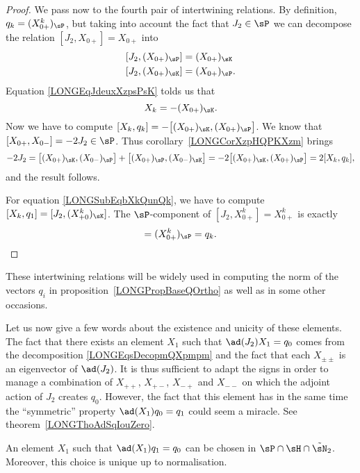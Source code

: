 \begin{proof}
	We pass now to the fourth pair of intertwining relations. By definition, $q_k=(X^k_{0+})_{\sP}$, but taking into account the fact that $J_2\in\sP$ we can decompose the relation $[J_2,X_{0+}]=X_{0+}$ into
	\begin{subequations}
		\begin{align}
			[J_2,(X_{0+})_{\sP}] & =(X_{0+})_{\sK}		\label{LONGEqJdeuxXzpsPsK} \\
			[J_2,(X_{0+})_{\sK}] & =(X_{0+})_{\sP}.
		\end{align}
	\end{subequations}
	Equation \eqref{LONGEqJdeuxXzpsPsK} tolds us that
	\begin{equation}
		X_k=-(X_{0+})_{\sK}.
	\end{equation}
	Now we have to compute $[X_k,q_k]=-\big[ (X_{0+})_{\sK},(X_{0+})_{\sP} \big]$. We know that $[X_{0+},X_{0-}]=-2J_2\in\sP$. Thus corollary~\ref{LONGCorXzpHQPKXzm} brings
	\begin{equation}
		-2J_2=\big[ (X_{0+})_{\sK},(X_{0-})_{\sP} \big]+\big[ (X_{0+})_{\sP},(X_{0-})_{\sK} \big]=-2\big[ (X_{0+})_{\sK},(X_{0+})_{\sP} \big]=2[X_k,q_k],
	\end{equation}
	and the result follows.

	For equation \eqref{LONGSubEqbXkQunQk}, we have to compute $[X_k,q_1]=[J_2,(X_{+0}^k)_{\sK}]$. The $\sP$-component of $[J_2,X_{0+}^k]=X_{0+}^k$ is exactly
	\begin{equation}
		[J_2,(X_{0+}^k)_{\sK}]=(X_{0+}^k)_{\sP}=q_k.
	\end{equation}

\end{proof}

These intertwining relations will be widely used in computing the norm of the vectors $q_i$ in proposition~\ref{LONGPropBaseQOrtho} as well as in some other occasions.

Let us now give a few words about the existence and unicity of these elements. The fact that there exists an element $X_1$ such that $\ad(J_2)X_1=q_0$ comes from the decomposition \eqref{LONGEqsDecopmQXpmpm} and the fact that each $X_{\pm\pm}$ is an eigenvector of $\ad(J_2)$. It is thus sufficient to adapt the signs in order to manage a combination of $X_{++}$, $X_{+-}$, $X_{-+}$ and $X_{--}$ on which the adjoint action of $J_2$ creates $q_0$. However, the fact that this element has in the same time the ``symmetric'' property $\ad(X_1)q_0=q_1$ could seem a miracle. See theorem~\ref{LONGThoAdSqIouZero}.

\begin{lemma}
	An element $X_1$ such that $\ad(X_1)q_1=q_0$ can be chosen in $\sP\cap\sH\cap\tilde\sN_2$. Moreover, this choice is unique up to normalisation.
\end{lemma}

